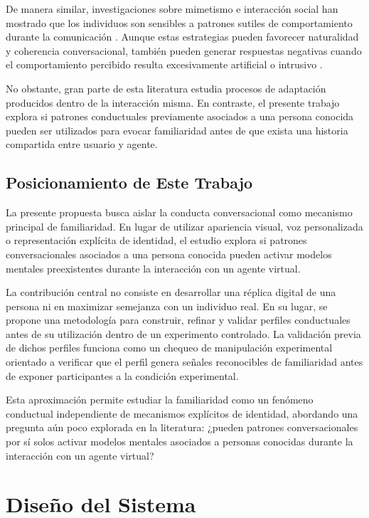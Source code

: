 \documentclass[sigconf, nonacm, language=spanish]{acmart}
\begin{document}
De manera similar, investigaciones sobre mimetismo e interacción social han mostrado que los individuos son sensibles a patrones sutiles de comportamiento durante la comunicación \cite{caridakis_virtual_2007}. Aunque estas estrategias pueden favorecer naturalidad y coherencia conversacional, también pueden generar respuestas negativas cuando el comportamiento percibido resulta excesivamente artificial o intrusivo \cite{wang_stop_2023}.

No obstante, gran parte de esta literatura estudia procesos de adaptación producidos dentro de la interacción misma. En contraste, el presente trabajo explora si patrones conductuales previamente asociados a una persona conocida pueden ser utilizados para evocar familiaridad antes de que exista una historia compartida entre usuario y agente.

\subsection{Posicionamiento de Este Trabajo}

La presente propuesta busca aislar la conducta conversacional como mecanismo principal de familiaridad. En lugar de utilizar apariencia visual, voz personalizada o representación explícita de identidad, el estudio explora si patrones conversacionales asociados a una persona conocida pueden activar modelos mentales preexistentes durante la interacción con un agente virtual.

La contribución central no consiste en desarrollar una réplica digital de una persona ni en maximizar semejanza con un individuo real. En su lugar, se propone una metodología para construir, refinar y validar perfiles conductuales antes de su utilización dentro de un experimento controlado. La validación previa de dichos perfiles funciona como un chequeo de manipulación experimental orientado a verificar que el perfil genera señales reconocibles de familiaridad antes de exponer participantes a la condición experimental.

Esta aproximación permite estudiar la familiaridad como un fenómeno conductual independiente de mecanismos explícitos de identidad, abordando una pregunta aún poco explorada en la literatura: ¿pueden patrones conversacionales por sí solos activar modelos mentales asociados a personas conocidas durante la interacción con un agente virtual?

\section{Diseño del Sistema}
\end{document}
